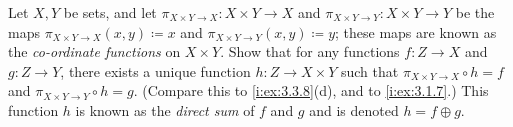 \begin{ex}\label{i:ex:3.5.7}
  Let \(X, Y\) be sets, and let \(\pi_{X \times Y \to X} : X \times Y \to X\) and \(\pi_{X \times Y \to Y} : X \times Y \to Y\) be the maps \(\pi_{X \times Y \to X}(x, y) \coloneqq x\) and \(\pi_{X \times Y \to Y}(x, y) \coloneqq y\);
  these maps are known as the \emph{co-ordinate functions} on \(X \times Y\).
  Show that for any functions \(f : Z \to X\) and \(g : Z \to Y\), there exists a unique function \(h : Z \to X \times Y\) such that \(\pi_{X \times Y \to X} \circ h = f\) and \(\pi_{X \times Y \to Y} \circ h = g\).
  (Compare this to \cref{i:ex:3.3.8}(d), and to \cref{i:ex:3.1.7}.)
  This function \(h\) is known as the \emph{direct sum} of \(f\) and \(g\) and is denoted \(h = f \oplus g\).
\end{ex}

